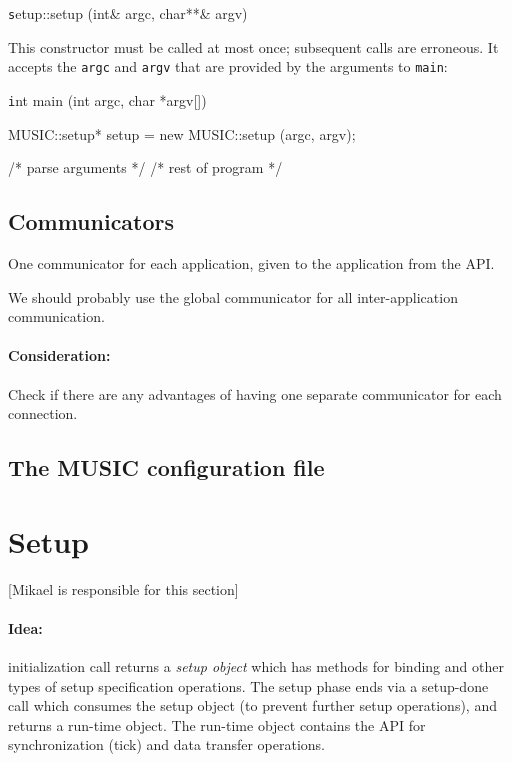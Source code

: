 \documentclass[a4paper]{report}
\newenvironment{metatext}%
{\color{blue}}%
{}
\newenvironment{head}%
{\texttt}%
{}
\newenvironment{code}%
{\texttt}%
{}
\newcommand{\responsible}[1]%
{{\color{red}[#1 is responsible for this section]}}
\begin{document}
\begin{head}
  setup::setup (int\& argc, char**\& argv)
\end{head}

This constructor must be called at most once; subsequent calls are
erroneous.  It accepts the \verb|argc| and \verb|argv| that are
provided by the arguments to \verb|main|:

\begin{code}
int main (int argc, char *argv[])
{
  MUSIC::setup* setup = new MUSIC::setup (argc, argv);

  /* parse arguments */
  /* rest of program */
}
\end{code}

\subsection{Communicators}

One communicator for each application, given to the application from
the API.

We should probably use the global communicator for all
inter-application communication.

\begin{metatext}
  \paragraph{Consideration:} Check if there are any advantages of having one
  separate communicator for each connection.
\end{metatext}

\subsection{The MUSIC configuration file}

\section{Setup}
\responsible{Mikael}

\paragraph{Idea:} initialization call returns a \emph{setup object}
which has methods for binding and other types of setup specification
operations.  The setup phase ends via a setup-done call which consumes
the setup object (to prevent further setup operations), and returns a
run-time object.  The run-time object contains the API for
synchronization (tick) and data transfer operations.
\end{document}
